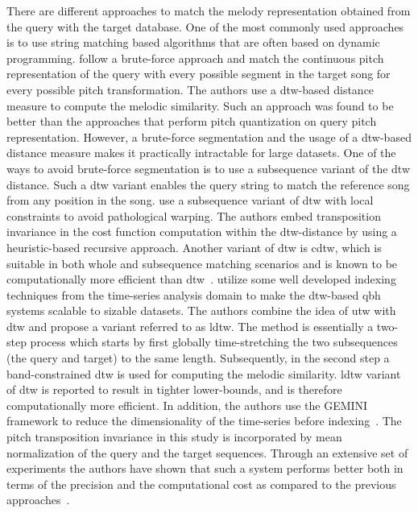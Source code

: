 There are different approaches to match the melody representation obtained from the query with the target database. One of the most commonly used approaches is to use string matching based algorithms that are often based on dynamic programming. \cite{mazzoni2001melody} follow a brute-force approach and match the continuous pitch representation of the query with every possible segment in the target song for every possible pitch transformation. The authors use a \gls{dtw}-based distance measure to compute the melodic similarity. Such an approach was found to be better than the approaches that perform pitch quantization on query pitch representation. However, a brute-force segmentation and the usage of a \gls{dtw}-based distance measure makes it practically intractable for large datasets. One of the ways to avoid brute-force segmentation is to use a subsequence variant of the \gls{dtw} distance. Such a \gls{dtw} variant enables the query string to match the reference song from any position in the song. \cite{jang2000query} use a subsequence variant of \gls{dtw} with local constraints to avoid pathological warping. The authors embed transposition invariance in the cost function computation within the \gls{dtw}-distance by using a heuristic-based recursive approach. Another variant of \gls{dtw} is \gls{cdtw}, which is suitable in both whole and subsequence matching scenarios and is known to be computationally more efficient than \gls{dtw}~\citep{lijffijt2010benchmarking}. \cite{zhu2003query} utilize some well developed indexing techniques from the time-series analysis domain to make the \gls{dtw}-based \gls{qbh} systems scalable to sizable datasets. The authors combine the idea of \gls{utw} with \gls{dtw} and propose a variant referred to as \gls{ldtw}. The method is essentially a two-step process which starts by first globally time-stretching the two subsequences (the query and target) to the same length. Subsequently, in the second step a band-constrained \gls{dtw} is used for computing the melodic similarity. \gls{ldtw} variant of \gls{dtw} is reported to result in tighter lower-bounds, and is therefore computationally more efficient. In addition, the authors use the GEMINI framework to reduce the dimensionality of the time-series before indexing~\citep{keogh2001dimensionality}. The pitch transposition invariance in this study is incorporated by mean normalization of the query and the target sequences. Through an extensive set of experiments the authors have shown that such a system performs better both in terms of the precision and the computational cost as compared to the previous approaches~\citep{zhu2003query}. 

